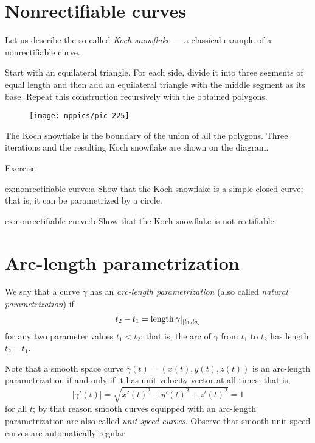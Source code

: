 \section{Nonrectifiable curves}

Let us describe the so-called \emph{Koch snowflake} ---
a classical example of a nonrectifiable curve.

Start with an equilateral triangle. For each side, divide it into three segments of equal length and then add an equilateral triangle with the middle segment as its base.
Repeat this construction recursively with the obtained polygons.
\begin{figure}[h!]
\centering
\texttt{[image: mppics/pic-225]}
\end{figure}
The Koch snowflake is the boundary of the union of all the polygons.
Three iterations and the resulting Koch snowflake are shown on the diagram.



\begin{thm}{Exercise}\label{ex:nonrectifiable-curve}

\begin{subthm}{ex:nonrectifiable-curve:a} Show that the Koch snowflake is a simple closed curve; that is, it can be parametrized by a circle.
\end{subthm}


\begin{subthm}{ex:nonrectifiable-curve:b} Show that the Koch snowflake is not rectifiable. 
\end{subthm}
\end{thm}
  
  
\section{Arc-length parametrization}

We say that a curve $\gamma$ has an \emph{arc-length parametrization} (also called \emph{natural parametrization})
if 
\[t_2-t_1=\mathop{\rm length}\nolimits \gamma|_{[t_1,t_2]}\]
for any two parameter values $t_1<t_2$;
that is, the arc of $\gamma$ from $t_1$ to $t_2$ has length $t_2-t_1$.

Note that a smooth space curve $\gamma(t)=(x(t),y(t),z(t))$ is an arc-length parametrization if and only if it has unit velocity vector at all times;
that is, 
\[|\gamma'(t)|=\sqrt{x'(t)^2+y'(t)^2+z'(t)^2}=1\]
for all $t$; by that reason smooth curves equipped with an arc-length parametrization are also called \emph{unit-speed curves}.
Observe that smooth unit-speed curves are automatically regular.

